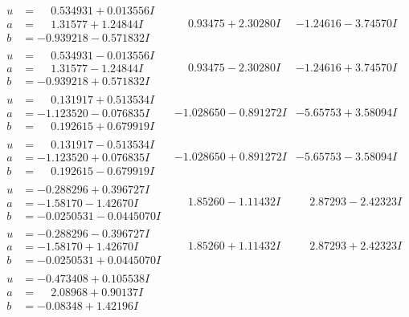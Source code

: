 \documentclass[1p]{elsarticle_modified}
\theoremstyle{definition}
\begin{document}
$$\begin{array}{c|c|c}
\begin{aligned}
u &= \phantom{-}0.534931 + 0.013556 I \\
a &= \phantom{-}1.31577 + 1.24844 I \\
b &= -0.939218 - 0.571832 I\end{aligned}
 & \phantom{-}0.93475 + 2.30280 I & -1.24616 - 3.74570 I \\ \hline\begin{aligned}
u &= \phantom{-}0.534931 - 0.013556 I \\
a &= \phantom{-}1.31577 - 1.24844 I \\
b &= -0.939218 + 0.571832 I\end{aligned}
 & \phantom{-}0.93475 - 2.30280 I & -1.24616 + 3.74570 I \\ \hline\begin{aligned}
u &= \phantom{-}0.131917 + 0.513534 I \\
a &= -1.123520 - 0.076835 I \\
b &= \phantom{-}0.192615 + 0.679919 I\end{aligned}
 & -1.028650 - 0.891272 I & -5.65753 + 3.58094 I \\ \hline\begin{aligned}
u &= \phantom{-}0.131917 - 0.513534 I \\
a &= -1.123520 + 0.076835 I \\
b &= \phantom{-}0.192615 - 0.679919 I\end{aligned}
 & -1.028650 + 0.891272 I & -5.65753 - 3.58094 I \\ \hline\begin{aligned}
u &= -0.288296 + 0.396727 I \\
a &= -1.58170 - 1.42670 I \\
b &= -0.0250531 - 0.0445070 I\end{aligned}
 & \phantom{-}1.85260 - 1.11432 I & \phantom{-}2.87293 - 2.42323 I \\ \hline\begin{aligned}
u &= -0.288296 - 0.396727 I \\
a &= -1.58170 + 1.42670 I \\
b &= -0.0250531 + 0.0445070 I\end{aligned}
 & \phantom{-}1.85260 + 1.11432 I & \phantom{-}2.87293 + 2.42323 I \\ \hline\begin{aligned}
u &= -0.473408 + 0.105538 I \\
a &= \phantom{-}2.08968 + 0.90137 I \\
b &= -0.08348 + 1.42196 I\end{aligned}

\end{array}$$
\end{document}
